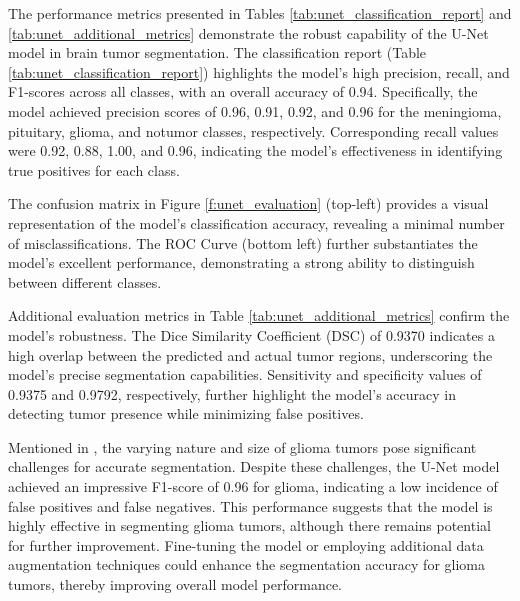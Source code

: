 The performance metrics presented in Tables \ref{tab:unet_classification_report} and \ref{tab:unet_additional_metrics} demonstrate the robust capability of the U-Net model in brain tumor segmentation. The classification report (Table \ref{tab:unet_classification_report}) highlights the model's high precision, recall, and F1-scores across all classes, with an overall accuracy of 0.94. Specifically, the model achieved precision scores of 0.96, 0.91, 0.92, and 0.96 for the meningioma, pituitary, glioma, and notumor classes, respectively. Corresponding recall values were 0.92, 0.88, 1.00, and 0.96, indicating the model's effectiveness in identifying true positives for each class.

The confusion matrix in Figure \ref{f:unet_evaluation} (top-left) provides a visual representation of the model's classification accuracy, revealing a minimal number of misclassifications. The ROC Curve (bottom left) further substantiates the model's excellent performance, demonstrating a strong ability to distinguish between different classes.

Additional evaluation metrics in Table \ref{tab:unet_additional_metrics} confirm the model's robustness. The Dice Similarity Coefficient (DSC) of 0.9370 indicates a high overlap between the predicted and actual tumor regions, underscoring the model's precise segmentation capabilities. Sensitivity and specificity values of 0.9375 and 0.9792, respectively, further highlight the model's accuracy in detecting tumor presence while minimizing false positives.

Mentioned in \cite{abd-ellah_automatic_2024}, the varying nature and size of glioma tumors pose significant challenges for accurate segmentation. Despite these challenges, the U-Net model achieved an impressive F1-score of 0.96 for glioma, indicating a low incidence of false positives and false negatives. This performance suggests that the model is highly effective in segmenting glioma tumors, although there remains potential for further improvement. Fine-tuning the model or employing additional data augmentation techniques could enhance the segmentation accuracy for glioma tumors, thereby improving overall model performance.



